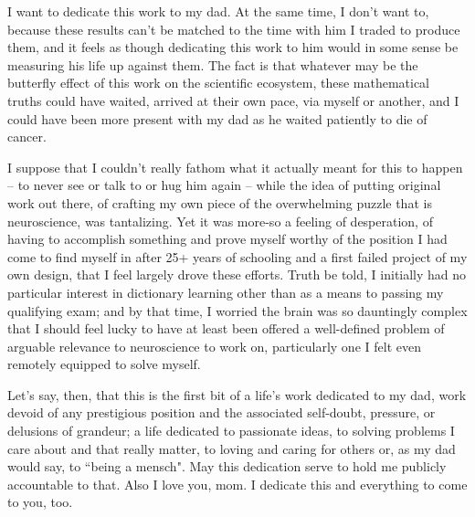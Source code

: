 \documentclass{ucbthesis}
\begin{document}
\begin{frontmatter}

\begin{dedication}
\null\vfil
I want to dedicate this work to my dad. At the same time, I don't want to, because these results can't be matched to the time with him I traded to produce them, and it feels as though dedicating this work to him would in some sense be measuring his life up against them. The fact is that whatever may be the butterfly effect of this work on the scientific ecosystem, these mathematical truths could have waited, arrived at their own pace, via myself or another, and I could have been more present with my dad as he waited patiently to die of cancer. 

I suppose that I couldn't really fathom what it actually meant for this to happen -- to never see or talk to or hug him again -- while the idea of putting original work out there, of crafting my own piece of the overwhelming puzzle that is neuroscience, was tantalizing. Yet it was more-so a feeling of desperation, of having to accomplish something and prove myself worthy of the position I had come to find myself in after 25+ years of schooling and a first failed project of my own design, that I feel largely drove these efforts. Truth be told, I initially had no particular interest in dictionary learning other than as a means to passing my qualifying exam; and by that time, I worried the brain was so dauntingly complex that I should feel lucky to have at least been offered a well-defined problem of arguable relevance to neuroscience to work on, particularly one I felt even remotely equipped to solve myself.

Let's say, then, that this is the first bit of a life's work dedicated to my dad, work devoid of any prestigious position and the associated self-doubt, pressure, or delusions of grandeur; a life dedicated to passionate ideas, to solving problems I care about and that really matter, to loving and caring for others or, as my dad would say, to ``being a mensch". May this dedication serve to hold me publicly accountable to that. Also I love you, mom. I dedicate this and everything to come to you, too.

\vspace{12pt}
\vfil\null
\end{dedication}



\end{frontmatter}
\end{document}
